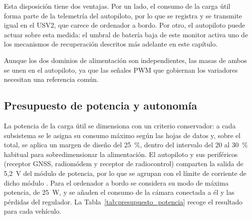 Esta disposición tiene dos ventajas. Por un lado, el consumo de la carga útil forma parte de la telemetría del 
autopiloto, por lo que se registra y se transmite igual en el USV2, que carece de ordenador a bordo. Por otro, el 
autopiloto puede actuar sobre esta medida: el umbral de batería baja de este monitor activa uno de los mecanismos de 
recuperación descritos más adelante en este capítulo.
 
Aunque los dos dominios de alimentación son independientes, las masas de ambos se unen en el autopiloto, ya que las 
señales PWM que gobiernan los variadores necesitan una referencia común.
 
\FloatBarrier
 
\subsection{Presupuesto de potencia y autonomía}
\label{subsec:presupuesto_potencia}
 
La potencia de la carga útil se dimensiona con un criterio conservador: a cada subsistema se le asigna su consumo 
máximo según las hojas de datos y, sobre el total, se aplica un margen de diseño del 25~\%, dentro del intervalo del 
20 al 30~\% habitual para sobredimensionar la alimentación. El autopiloto y sus periféricos (receptor GNSS, radiomódem 
y receptor de radiocontrol) comparten la salida de 5,2~V del módulo de potencia, por lo que se agrupan con el límite de 
corriente de dicho módulo \cite{holybro_pm02d}. Para el ordenador a bordo se considera su modo de máxima potencia, de 
25~W, y se añaden el consumo de la cámara conectada a él y las pérdidas del regulador. La 
Tabla~\ref{tab:presupuesto_potencia} recoge el resultado para cada vehículo.
 
